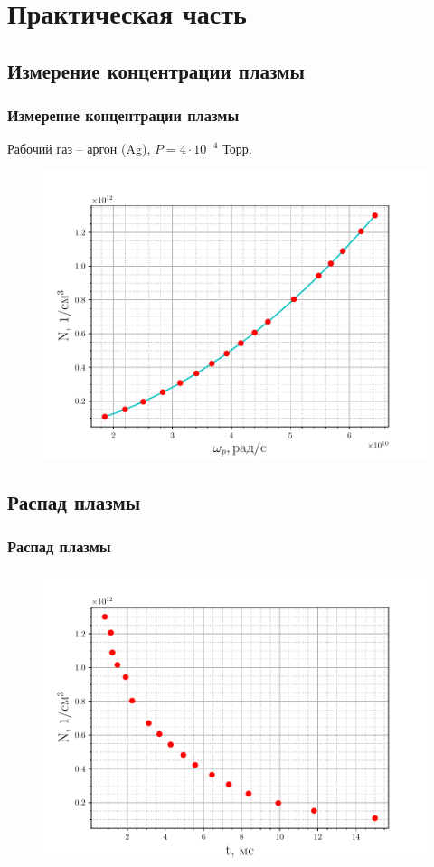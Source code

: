 \documentclass[10pt,pdf,hyperref={unicode}, dvipsnames]{beamer}
\begin{document}
\section{Практическая часть} %
\subsection{Измерение концентрации плазмы}
\begin{frame}
	\frametitle{Измерение концентрации плазмы}
	Рабочий газ -- аргон (Ag), 
	$P=4\cdot10^{-4}$ Торр. 
	\begin{figure}[tb]
		\vspace{-5pt}
		\centering
		\includegraphics[width=0.89\linewidth]{fig/concentration}
		\label{fig:1}
	\end{figure}
\end{frame}
\subsection{Распад  плазмы}
\begin{frame}
	\frametitle{Распад плазмы}
	\begin{figure}[tb]
		\centering
		\includegraphics[width=0.9\linewidth]{fig/decay}
		\label{fig:2}
	\end{figure}
\end{frame}
\end{document}
